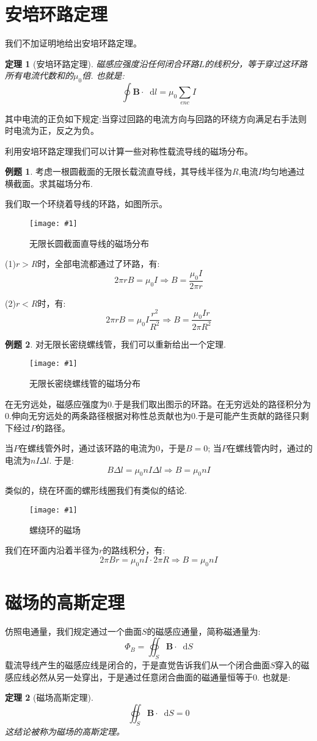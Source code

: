 \documentclass[12pt,a4paper,oneside]{report}
\newtheorem{theorem}{定理}[chapter]
\theoremstyle{definition}
\newtheorem{example}{例题}[chapter]
\theoremstyle{remark}
\newcommand{\insertfig}[3]{
    \begin{figure}[ht]
        \centering
        \texttt{[image: \#1]}
        \caption{#2}
        \label{fig:#1}
    \end{figure}
}
\renewcommand{\d}{\mathop{}\!\mathrm{d}}
\begin{document}
\section{安培环路定理}

我们不加证明地给出安培环路定理。
\begin{theorem}[安培环路定理]

磁感应强度沿任何闭合环路$L$的线积分，等于穿过这环路所有电流代数和的$\mu_0$倍. 也就是: 
\[
\oint \mathbf{B} \cdot \d l = \mu_0 \sum_{enc} I
\]

\end{theorem}

其中电流的正负如下规定:当穿过回路的电流方向与回路的环绕方向满足右手法则时电流为正，反之为负。

利用安培环路定理我们可以计算一些对称性载流导线的磁场分布。

\begin{example}
考虑一根圆截面的无限长载流直导线，其导线半径为$R$,电流$I$均匀地通过横截面。求其磁场分布.

我们取一个环绕着导线的环路，如图所示。
\insertfig{2-6.png}{无限长圆截面直导线的磁场分布}{0.2}

(1)$r>R$时，全部电流都通过了环路，有:
\[
2\pi r B = \mu_0 I\Rightarrow B = \frac{\mu_0 I}{2\pi r}
\]

(2)$r<R$时，有:
\[
2\pi r B = \mu_0 I \frac{r^2}{R^2} \Rightarrow B = \frac{\mu_0 Ir}{2\pi R^2}
\]
\end{example}

\begin{example}
对无限长密绕螺线管，我们可以重新给出一个定理.
\insertfig{2-7.png}{无限长密绕螺线管的磁场分布}{0.25}

在无穷远处，磁感应强度为$0$.于是我们取出图示的环路。在无穷远处的路径积分为$0$.伸向无穷远处的两条路径根据对称性总贡献也为$0$.于是可能产生贡献的路径只剩下经过$P$的路径。

当$P$在螺线管外时，通过该环路的电流为0，于是$B=0$; 当$P$在螺线管内时，通过的电流为$nI\Delta l$. 于是:
\[
B \Delta l = \mu_0 n I \Delta l \Rightarrow B = \mu_0 nI
\]

类似的，绕在环面的螺形线圈我们有类似的结论.

\insertfig{2-8.png}{螺绕环的磁场}{0.25}

我们在环面内沿着半径为$r$的路线积分，有:\[
2\pi Br =\mu_0 n I \cdot 2\pi R \Rightarrow B = \mu_0 nI
\]

\end{example}

\section{磁场的高斯定理}
仿照电通量，我们规定通过一个曲面$S$的磁感应通量，简称磁通量为:
\[
\Phi_B= \oiint_S \mathbf{B}\cdot \d S
\]
载流导线产生的磁感应线是闭合的，于是直觉告诉我们从一个闭合曲面$S$穿入的磁感应线必然从另一处穿出，于是通过任意闭合曲面的磁通量恒等于$0$. 也就是:
\begin{theorem}[磁场高斯定理]
  

\[
\oiint_S \mathbf{B}\cdot \d S =0
\]
这结论被称为磁场的高斯定理。
\end{theorem}
\end{document}
